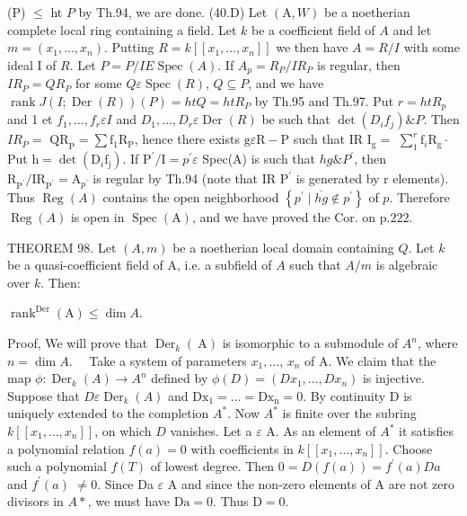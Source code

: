 (P) $\leqslant$ ht $P$ by Th.94, we are done. (40.D) Let $(\mathrm{A}, W)$ be a noetherian complete local ring containing a field. Let $k$ be a coefficient field of $A$ and let $m=\left(x_{1}, \ldots, x_{n}\right) .$ Putting $R=k\left[\left[x_{1}, \ldots, x_{n}\right]\right]$ we then have $A=R / I$ with some ideal I of $R$. Let $P=P / I E \operatorname{Spec}(A)$. If $A_{p}=R_{P} / I R_{P}$ is regular, then $I R_{P}=Q R_{P}$ for some $Q \varepsilon \operatorname{Spec}(R)$, $Q \subseteq P$, and we have $\operatorname{rank} J(I ; \operatorname{Der}(R))(P)=h t Q=h t R_{P}$ by Th.95 and Th.97. Put $r=h t R_{p}$ and 1 et $f_{1}, \ldots, f_{r} \varepsilon I$ and $D_{1}, \ldots, D_{r} \varepsilon \operatorname{Der}(R)$ be such that $\operatorname{det}\left(D_{i} f_{j}\right) \& P$. Then $I R_{P}=$ $\mathrm{QR}_{\mathrm{P}}=\sum \mathrm{f}_{1} \mathrm{R}_{\mathrm{P}}$, hence there exists $\mathrm{g} \varepsilon \mathrm{R}-\mathrm{P}$ such that IR $\mathrm{I}_{\mathrm{g}}=$ $\sum_{1}^{r} \mathrm{f}_{i} \mathrm{R}_{\mathrm{g}} \cdot$ Put $\mathrm{h}=\operatorname{det}\left(\mathrm{D}_{i} \mathrm{f}_{\mathrm{j}}\right)$. If $\mathrm{P}^{\prime} / \mathrm{I}=p^{\prime} \varepsilon$ Spec(A) is such that $h g \& P^{\prime}$, then $\mathrm{R}_{\mathrm{P}^{\prime}} / \mathrm{IR}_{\mathrm{P}^{\prime}}=\mathrm{A}_{p^{\prime}}$ is regular by Th.94 (note that IR $\mathrm{P}^{\prime}$ is generated by r elements). Thus $\operatorname{Reg}(A)$ contains the open neighborhood $\left\{p^{\prime} \mid \overline{h g} \notin p^{\prime}\right\}$ of $p$. Therefore $\operatorname{Reg}(A)$ is open in $\operatorname{Spec}(\mathrm{A})$, and we have proved the Cor. on $\mathrm{p} .222$.

THEOREM 98. Let $(A, m)$ be a noetherian local domain containing $Q$. Let $k$ be a quasi-coefficient field of A, i.e. a subfield of $A$ such that $A / m$ is algebraic over $k$. Then:

$\operatorname{rank}^{\operatorname{Der}}(\mathrm{A}) \leqslant \operatorname{dim} A$.

Proof, We will prove that $\operatorname{Der}_{k}(\mathrm{~A})$ is isomorphic to a submodule of $A^{n}$, where $n=\operatorname{dim} A . \quad$ Take a system of parameters $x_{1}, \ldots$, $x_{n}$ of A. We claim that the map $\phi: \operatorname{Der}_{k}(A) \rightarrow A^{n}$ defined by $\phi(D)=\left(D x_{1}, \ldots, D x_{n}\right)$ is injective. Suppose that $D \varepsilon \operatorname{Der}_{k}(A)$ and $\mathrm{Dx}_{1}=\ldots=\mathrm{Dx}_{\mathrm{n}}=0$. By continuity $\mathrm{D}$ is uniquely extended to the completion $A^{*}$. Now $A^{*}$ is finite over the subring $k\left[\left[x_{1}, \ldots, x_{n}\right]\right]$, on which $D$ vanishes. Let a $\varepsilon$ A. As an element of $A^{*}$ it satisfies a polynomial relation $f(a)=0$ with coefficients in $k\left[\left[x_{1}, \ldots, x_{n}\right]\right]$. Choose such a polynomial $f(T)$ of lowest degree. Then $0=D(f(a))=f^{\prime}(a) D a$ and $f^{\prime}(a)$ $\neq 0$. Since Da $\varepsilon$ A and since the non-zero elements of A are not zero divisors in $A *$, we must have $\mathrm{Da}=0$. Thus $\mathrm{D}=0$.

